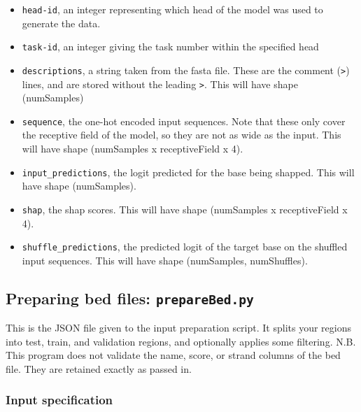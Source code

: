 \documentclass{article}
\begin{document}
\begin{itemize}
    \item \texttt{head-id}, an integer representing which head of the model was used to generate the data.
    \item \texttt{task-id}, an integer giving the task number within the specified head
    \item \texttt{descriptions}, a string taken from the fasta file. These are the comment (\texttt{>}) lines, and are stored without the leading \texttt{>}. This will have shape (numSamples)
    \item \texttt{sequence}, the one-hot encoded input sequences. Note that these only cover the receptive field of the model, so they are not as wide as the input. This will have shape (numSamples x receptiveField x 4).
    \item \texttt{input\_predictions}, the logit predicted for the base being shapped. This will have shape (numSamples).
    \item \texttt{shap}, the shap scores. This will have shape (numSamples x receptiveField x 4).
    \item \texttt{shuffle\_predictions}, the predicted logit of the target base on the shuffled input sequences. This will have shape (numSamples, numShuffles).
\end{itemize}




\newpage

\subsection{Preparing bed files: \texttt{prepareBed.py}}

This is the JSON file given to the input preparation script. It splits your regions into
test, train, and validation regions, and optionally applies some filtering.
N.B. This program does not validate the name, score, or strand columns of the bed file.
They are retained exactly as passed in.

\subsubsection{Input specification}
\end{document}
